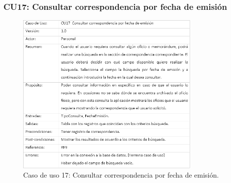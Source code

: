 		\subsubsection{CU17: Consultar correspondencia por fecha de emisión}
\begin{figure}[htbp!]
		\centering
			\includegraphics[width=0.8\textwidth]{images/CU/CU17}
		\caption{Caso de uso 17: Consultar correspondencia por fecha de emisión.}
		\label{Tabla}
	\end{figure}
	
